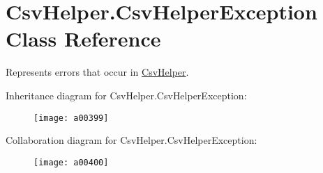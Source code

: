 \hypertarget{a00065}{\section{Csv\-Helper.\-Csv\-Helper\-Exception Class Reference}
\label{a00065}
}


Represents errors that occur in \hyperlink{a00314}{Csv\-Helper}.  




Inheritance diagram for Csv\-Helper.\-Csv\-Helper\-Exception\-:
\nopagebreak
\begin{figure}[H]
\begin{center}
\leavevmode
\texttt{[image: a00399]}
\end{center}
\end{figure}


Collaboration diagram for Csv\-Helper.\-Csv\-Helper\-Exception\-:
\nopagebreak
\begin{figure}[H]
\begin{center}
\leavevmode
\texttt{[image: a00400]}
\end{center}
\end{figure}
